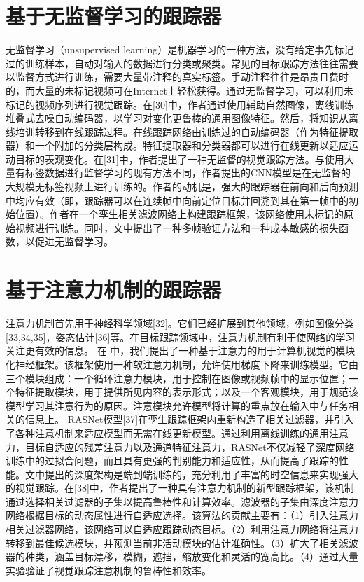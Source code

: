 \section{基于无监督学习的跟踪器}
无监督学习（unsupervised learning）是机器学习的一种方法，没有给定事先标记过的训练样本，自动对输入的数据进行分类或聚类。常见的目标跟踪方法往往需要以监督方式进行训练，需要大量带注释的真实标签。手动注释往往是昂贵且费时的，而大量的未标记视频可在Internet上轻松获得。通过无监督学习，可以利用未标记的视频序列进行视觉跟踪。在[30]中，作者通过使用辅助自然图像，离线训练堆叠式去噪自动编码器，以学习对变化更鲁棒的通用图像特征。然后，将知识从离线培训转移到在线跟踪过程。在线跟踪网络由训练过的自动编码器（作为特征提取器）和一个附加的分类层构成。特征提取器和分类器都可以进行在线更新以适应运动目标的表观变化。在[31]中，作者提出了一种无监督的视觉跟踪方法。与使用大量有标签数据进行监督学习的现有方法不同，作者提出的CNN模型是在无监督的大规模无标签视频上进行训练的。作者的动机是，强大的跟踪器在前向和后向预测中均应有效（即，跟踪器可以在连续帧中向前定位目标并回溯到其在第一帧中的初始位置）。作者在一个孪生相关滤波网络上构建跟踪框架，该网络使用未标记的原始视频进行训练。同时，文中提出了一种多帧验证方法和一种成本敏感的损失函数，以促进无监督学习。
\section{基于注意力机制的跟踪器}
注意力机制首先用于神经科学领域[32]。它们已经扩展到其他领域，例如图像分类[33,34,35]，姿态估计[36]等。在目标跟踪领域中，注意力机制有利于使网络的学习关注更有效的信息。
在 \cite{RATM} 中，我们提出了一种基于注意力的用于计算机视觉的模块化神经框架。该框架使用一种软注意力机制，允许使用梯度下降来训练模型。它由三个模块组成：一个循环注意力模块，用于控制在图像或视频帧中的显示位置；一个特征提取模块，用于提供所见内容的表示形式；以及一个客观模块，用于规范该模型学习其注意行为的原因。注意模块允许模型将计算的重点放在输入中与任务相关的信息上。%
RASNet模型[37]在孪生跟踪框架内重新构造了相关过滤器，并引入了各种注意机制来适应模型而无需在线更新模型。通过利用离线训练的通用注意力，目标自适应的残差注意力以及通道特征注意力，RASNet不仅减轻了深度网络训练中的过拟合问题，而且具有更强的判别能力和适应性，从而提高了跟踪的性能。文中提出的深度架构是端到端训练的，充分利用了丰富的时空信息来实现强大的视觉跟踪。在[38]中，作者提出了一种具有注意力机制的新型跟踪框架，该机制通过选择相关过滤器的子集以提高鲁棒性和计算效率。滤波器的子集由深度注意力网络根据目标的动态属性进行自适应选择。该算法的贡献主要有：（1）引入注意力相关过滤器网络，该网络可以自适应跟踪动态目标。（2）利用注意力网络将注意力转移到最佳候选模块，并预测当前非活动模块的估计准确性。（3）扩大了相关滤波器的种类，涵盖目标漂移，模糊，遮挡，缩放变化和灵活的宽高比。（4）通过大量实验验证了视觉跟踪注意机制的鲁棒性和效率。
